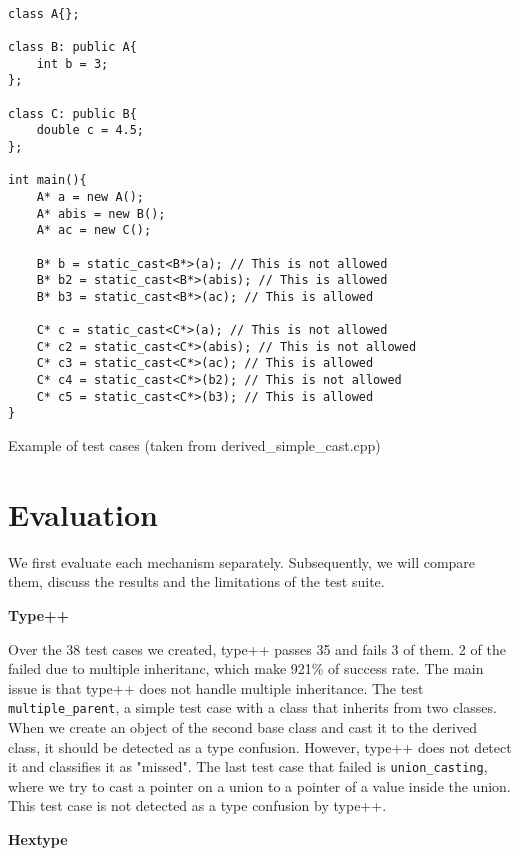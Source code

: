 \documentclass[a4paper,11pt,oneside]{report}
\begin{document}
\begin{listing}
       \begin{verbatim}

class A{};

class B: public A{
    int b = 3;
};

class C: public B{
    double c = 4.5;
}; 

int main(){
    A* a = new A();
    A* abis = new B();
    A* ac = new C();

    B* b = static_cast<B*>(a); // This is not allowed
    B* b2 = static_cast<B*>(abis); // This is allowed
    B* b3 = static_cast<B*>(ac); // This is allowed

    C* c = static_cast<C*>(a); // This is not allowed
    C* c2 = static_cast<C*>(abis); // This is not allowed
    C* c3 = static_cast<C*>(ac); // This is allowed
    C* c4 = static_cast<C*>(b2); // This is not allowed
    C* c5 = static_cast<C*>(b3); // This is allowed
}
       \end{verbatim}
       \caption{Example of test cases (taken from derived\_simple\_cast.cpp)}
       \label{lst:test_cases}
\end{listing}

\chapter{Evaluation}

We first evaluate each mechanism separately. Subsequently,
we will compare them, discuss the results and the limitations of the test suite.

\textbf{Type++}

\noindent{}Over the 38 test cases we created, type++ passes 35 and 
fails 3 of them. 2 of the failed due to multiple inheritanc, which make 
92\.1\% of success rate. The main issue 
is that type++ does not handle multiple inheritance. The test \texttt{multiple\_parent},
a simple test case with a class that inherits from two classes. When we create an object
of the second base class and cast it to the derived class, it should be detected as a type confusion.
However, type++ does not detect it and classifies it as "missed". 
The last test case that failed is \texttt{union\_casting}, where we try to cast a pointer on a union
to a pointer of a value inside the union. This test case is not detected as a type confusion by type++.

\textbf{Hextype}
\end{document}
